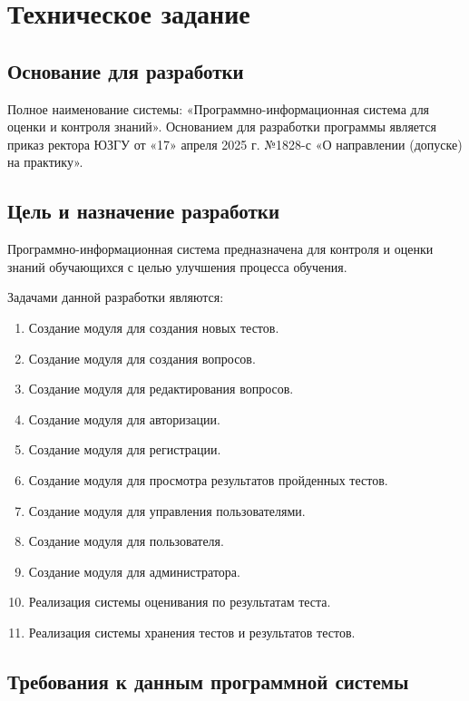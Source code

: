 \section{Техническое задание}
\subsection{Основание для разработки}

Полное наименование системы: «Программно-информационная система для оценки и контроля знаний».
Основанием для разработки программы является приказ ректора ЮЗГУ
от «17» апреля 2025 г. №1828-с «О направлении (допуске) на практику».

\subsection{Цель и назначение разработки}

Программно-информационная система предназначена для контроля и оценки знаний обучающихся с целью улучшения процесса обучения.

Задачами данной разработки являются:
\begin{enumerate}
\item Создание модуля для создания новых тестов.
\item Создание модуля для создания вопросов.
\item Создание модуля для редактирования вопросов.
\item Создание модуля для авторизации.
\item Создание модуля для регистрации.
\item Создание модуля для просмотра результатов пройденных тестов.
\item Создание модуля для управления пользователями.
\item Создание модуля для пользователя.
\item Создание модуля для администратора.
\item Реализация системы оценивания по результатам теста.
\item Реализация системы хранения тестов и результатов тестов.
\end{enumerate}

\subsection{Требования к данным программной системы}

